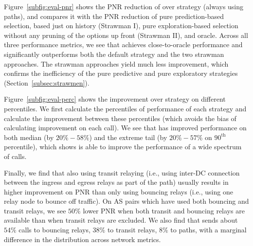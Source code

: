 Figure~\ref{subfig:eval-pnr} shows the PNR reduction of \hybrid over \direct strategy (always using \direct paths), and compares it with the PNR reduction of {pure} prediction-based {selection, based just on history} (Strawman I), {pure} exploration-based selection {without any pruning of the options up front}  (Strawman II), and oracle. 
Across all three performance metrics, we see that \hybrid achieves close-to-oracle performance and significantly outperforms both the default strategy and the two strawman approaches. 
The strawman approaches yield much less improvement, which confirms the inefficiency of the {pure} predictive and {pure} exploratory strategies (Section~\ref{subsec:strawmen}).

Figure~\ref{subfig:eval-perc} shows the improvement over \direct strategy on different percentiles.  
We first calculate the percentiles of performance of each strategy and calculate the improvement between these percentiles (which avoids the bias of calculating improvement on each call).
We see that \hybrid has improved performance on both median (by $20\%-58\%$) and {the extreme} tail (by $20\%-57\%$ on $90^\text{th}$ percentile), which shows \hybrid is able to improve the performance of a wide spectrum of calls. %

Finally, we find that also using transit relaying (i.e., using inter-DC connection between the {ingress and egress relays} as part of the path) usually results in higher improvement on PNR than only using bouncing relays (i.e., using one relay node to bounce off traffic). On AS pairs which have used both bouncing and transit relays, we see $50\%$ {lower} PNR when both transit and bouncing relays are available than when transit relays are excluded.
We also find that \hybrid sends about $54\%$ calls to bouncing relays, $38\%$ to transit relays, $8\%$ to \direct paths, with a marginal difference {in the distribution} across network metrics.

